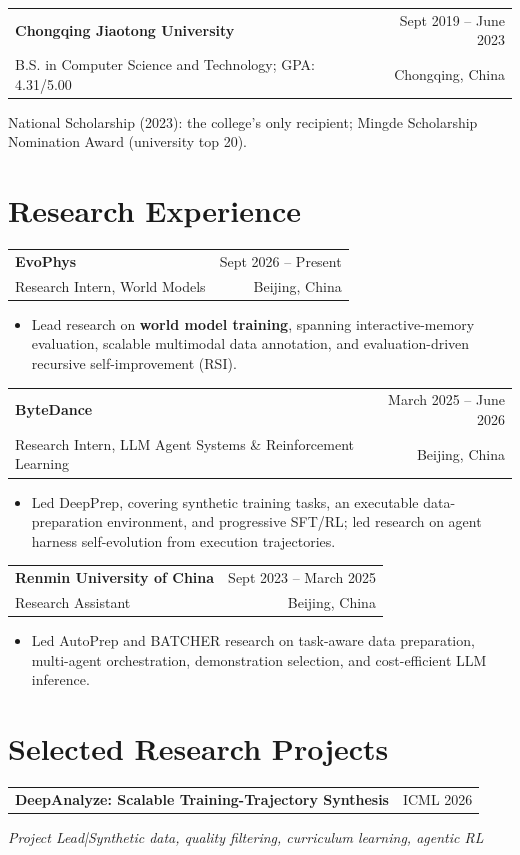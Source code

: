 \documentclass[a4paper,10pt]{article}
\makeatletter
\newcommand{\entry}[4]{%
  \needspace{3\baselineskip}
  \begin{tabularx}{\linewidth}{@{}Xr@{}}
  \textbf{#1} & {\small #2}\\
  {\small #3} & {\small\color{muted}#4}
  \end{tabularx}\par
}
\newcommand{\project}[3]{%
  \needspace{5\baselineskip}\vspace{3pt}
  \begin{tabularx}{\linewidth}{@{}Xr@{}}
  \textbf{#1} & {\small\color{navy}#2}
  \end{tabularx}\par
  {\small\itshape\color{muted}#3}\par
}
\makeatother
\begin{document}
\entry{Chongqing Jiaotong University}{Sept 2019 -- June 2023}
{B.S. in Computer Science and Technology; GPA: 4.31/5.00}
{Chongqing, China}

{\small National Scholarship (2023): the college's only recipient; Mingde Scholarship Nomination Award (university top 20).}

\section{Research Experience}

\entry{EvoPhys}{Sept 2026 -- Present}
{Research Intern, World Models}{Beijing, China}
\begin{itemize}
  \item Lead research on \textbf{world model training}, spanning interactive-memory evaluation, scalable multimodal data annotation, and evaluation-driven recursive self-improvement (RSI).
\end{itemize}

\entry{ByteDance}{March 2025 -- June 2026}
{Research Intern, LLM Agent Systems \& Reinforcement Learning}{Beijing, China}
\begin{itemize}
  \item Led DeepPrep, covering synthetic training tasks, an executable data-preparation environment, and progressive SFT/RL; led research on agent harness self-evolution from execution trajectories.
\end{itemize}

\entry{Renmin University of China}{Sept 2023 -- March 2025}
{Research Assistant}{Beijing, China}
\begin{itemize}
  \item Led AutoPrep and BATCHER research on task-aware data preparation, multi-agent orchestration, demonstration selection, and cost-efficient LLM inference.
\end{itemize}

\section{Selected Research Projects}

\project{DeepAnalyze: Scalable Training-Trajectory Synthesis}{ICML 2026}
{Project Lead\quad|\quad Synthetic data, quality filtering, curriculum learning, agentic RL}
\end{document}
